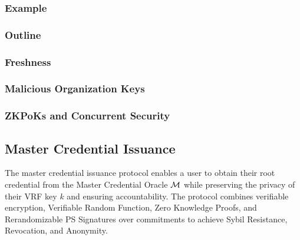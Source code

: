 \subsubsection{Example}
\subsubsection{Outline}
\subsubsection{Freshness}
\subsubsection{Malicious Organization Keys}
\subsubsection{ZKPoKs and Concurrent Security}





\newpage
\subsection{Master Credential Issuance}
The master credential issuance protocol enables a user to obtain their root credential from the Master Credential Oracle $\mathcal{M}$ while preserving the privacy of their VRF key $k$ and ensuring accountability. The protocol combines verifiable encryption, Verifiable Random Function, Zero Knowledge Proofs, and Rerandomizable PS Signatures over commitments to achieve Sybil Resistance, Revocation, and Anonymity.

